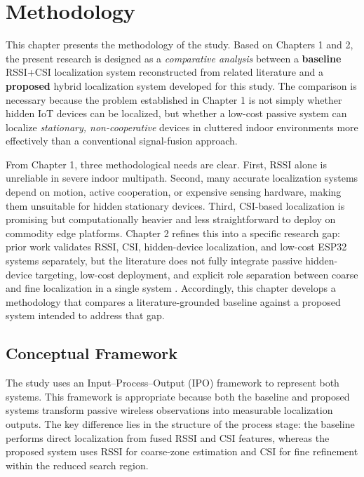 \section{Methodology}

This chapter presents the methodology of the study. Based on Chapters 1 and 2, the present research is designed as a \textit{comparative analysis} between a \textbf{baseline} RSSI+CSI localization system reconstructed from related literature and a \textbf{proposed} hybrid localization system developed for this study. The comparison is necessary because the problem established in Chapter 1 is not simply whether hidden IoT devices can be localized, but whether a low-cost passive system can localize \textit{stationary, non-cooperative} devices in cluttered indoor environments more effectively than a conventional signal-fusion approach.

From Chapter 1, three methodological needs are clear. First, RSSI alone is unreliable in severe indoor multipath. Second, many accurate localization systems depend on motion, active cooperation, or expensive sensing hardware, making them unsuitable for hidden stationary devices. Third, CSI-based localization is promising but computationally heavier and less straightforward to deploy on commodity edge platforms. Chapter 2 refines this into a specific research gap: prior work validates RSSI, CSI, hidden-device localization, and low-cost ESP32 systems separately, but the literature does not fully integrate passive hidden-device targeting, low-cost deployment, and explicit role separation between coarse and fine localization in a single system \cite{yang2013rssi2csi,li2024efficient,mottakin2024swiloc,reyes2025temporal,ju2025hidden}. Accordingly, this chapter develops a methodology that compares a literature-grounded baseline against a proposed system intended to address that gap.

\subsection{Conceptual Framework}

The study uses an Input--Process--Output (IPO) framework to represent both systems. This framework is appropriate because both the baseline and proposed systems transform passive wireless observations into measurable localization outputs. The key difference lies in the structure of the process stage: the baseline performs direct localization from fused RSSI and CSI features, whereas the proposed system uses RSSI for coarse-zone estimation and CSI for fine refinement within the reduced search region.

